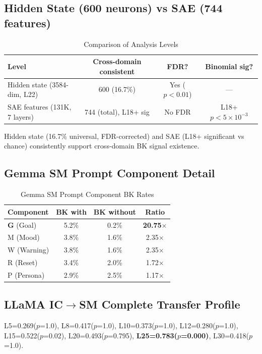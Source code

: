 \documentclass[11pt,a4paper]{article}
\begin{document}
\subsection{Hidden State (600 neurons) vs SAE (744 features)}

\begin{table}[H]
\centering
\caption{Comparison of Analysis Levels}\label{tab:a1}
\footnotesize
\begin{tabular}{lccc}
\toprule
Level & Cross-domain consistent & FDR? & Binomial sig? \\
\midrule
Hidden state (3584-dim, L22) & 600 (16.7\%) & Yes ($p<0.01$) & --- \\
SAE features (131K, 7 layers) & 744 (total), L18+ sig & No FDR & L18+ $p<5\times10^{-3}$ \\
\bottomrule
\end{tabular}
\end{table}

\noindent Hidden state (16.7\% universal, FDR-corrected) and SAE (L18+ significant vs chance) consistently support cross-domain BK signal existence.

\subsection{Gemma SM Prompt Component Detail}

\begin{table}[H]
\centering
\caption{Gemma SM Prompt Component BK Rates}\label{tab:a2}
\footnotesize
\begin{tabular}{lccc}
\toprule
Component & BK with & BK without & Ratio \\
\midrule
\textbf{G} (Goal) & 5.2\% & 0.2\% & \textbf{20.75$\times$} \\
M (Mood)     & 3.8\% & 1.6\% & 2.35$\times$ \\
W (Warning)  & 3.8\% & 1.6\% & 2.35$\times$ \\
R (Reset)    & 3.4\% & 2.0\% & 1.72$\times$ \\
P (Persona)  & 2.9\% & 2.5\% & 1.17$\times$ \\
\bottomrule
\end{tabular}
\end{table}

\subsection{LLaMA IC$\rightarrow$SM Complete Transfer Profile}

L5=0.269($p$=1.0), L8=0.417($p$=1.0), L10=0.373($p$=1.0), L12=0.280($p$=1.0), L15=0.522($p$=0.02), L20=0.493($p$=0.795), \textbf{L25=0.783($p$=0.000)}, L30=0.418($p$=1.0).
\end{document}
